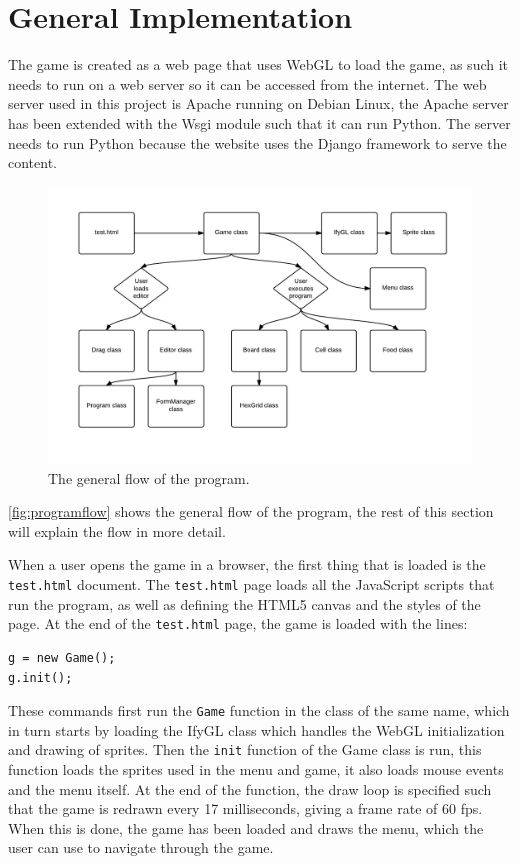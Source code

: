 \section{General Implementation}
The game is created as a web page that uses WebGL to load the game, as such it needs to run on a web server so it can be accessed from the internet. The web server used in this project is Apache running on Debian Linux, the Apache server has been extended with the Wsgi module such that it can run Python. The server needs to run Python because the website uses the Django framework to serve the content.

\begin{figure}[ht]
\includegraphics[width=\textwidth]{img/Program_flow.pdf}
\caption{The general flow of the program.}
\label{fig:programflow}
\end{figure}

\autoref{fig:programflow} shows the general flow of the program, the rest of this section will explain the flow in more detail.\newline

When a user opens the game in a browser, the first thing that is loaded is the \texttt{test.html} document. The \texttt{test.html} page loads all the JavaScript scripts that run the program, as well as defining the HTML5 canvas and the styles of the page. At the end of the \texttt{test.html} page, the game is loaded with the lines: 

\begin{lstlisting}
g = new Game();
g.init();
\end{lstlisting}

These commands first run the \texttt{Game} function in the class of the same name, which in turn starts by loading the IfyGL class which handles the WebGL initialization and drawing of sprites. Then the \texttt{init} function of the Game class is run, this function loads the sprites used in the menu and game, it also loads mouse events and the menu itself. At the end of the function, the draw loop is specified such that the game is redrawn every 17 milliseconds, giving a frame rate of 60 fps.
When this is done, the game has been loaded and draws the menu, which the user can use to navigate through the game.\newline

